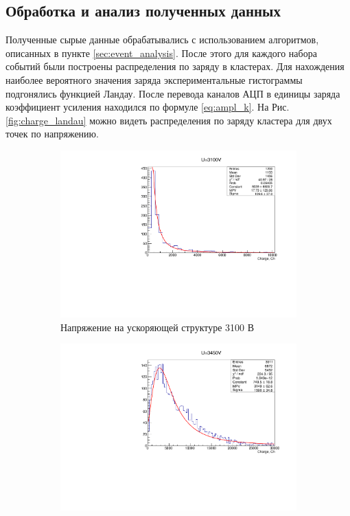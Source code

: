 \subsection{Обработка и анализ полученных данных}
Полученные сырые данные обрабатывались с использованием алгоритмов, описанных в пункте \ref{sec:event_analysis}. После этого для каждого набора событий были построены распределения по заряду в кластерах. Для нахождения наиболее вероятного значения заряда экспериментальные гистограммы подгонялись функцией Ландау. После перевода каналов АЦП в единицы заряда коэффициент усиления находился по формуле \ref{eq:ampl_k}. На Рис. \ref{fig:charge_landau} можно видеть распределения по заряду кластера для двух точек по напряжению. 
\begin{figure}[h]
\centering
\begin{subfigure}{.45\textwidth}
	\centering
	\includegraphics[width=1\linewidth]{img/3100.pdf}
	\caption{Напряжение на ускоряющей структуре 3100 В}
\end{subfigure}%
\hspace{20pt}
\begin{subfigure}{.45\textwidth}
	\centering
	\includegraphics[width=1\linewidth]{img/3450.pdf}

\end{subfigure}
\end{figure}

